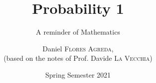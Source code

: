 \documentclass[notes=show,handout]{beamer}\usepackage[]{graphicx}\usepackage[]{color}
\newtheorem{statement}{Statement}[section]
\begin{document}
\title[S110015]{Probability 1}
\subtitle{A reminder of Mathematics}
\author[Flores Agreda, La Vecchia]{Daniel \textsc{Flores Agreda}, \\ (based on the notes of Prof. Davide \textsc{La Vecchia})}
\date{Spring Semester 2021}

\begin{frame}
\titlepage
\end{frame}


%
%
%
%
%
%
%
%
%
%
%



%
%
%
%
%
%
%
%
%
\end{document}
